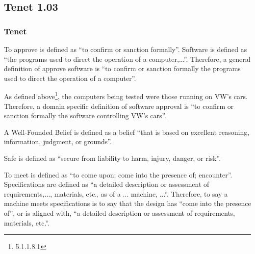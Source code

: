 \subsection{Tenet 1.03}
\subsubsection{Tenet}

To approve is defined as ``to confirm or sanction formally''\cite{dictionary_com}. Software is defined as ``the programs used to direct the operation of a computer,...''\cite{dictionary_com}. Therefore, a general definition of approve software is ``to confirm or sanction formally the programs used to direct the operation of a computer''.

As defined above\footnote{5.1.1.8.1}, the computers being tested were those running on VW's cars. Therefore, a domain specific definition of software approval is ``to confirm or sanction formally the software controlling VW's cars''.

A Well-Founded Belief is defined as a belief ``that is based on excellent reasoning, information, judgment, or grounds''\cite{merriam_webster}.

Safe is defined as ``secure from liability to harm, injury, danger, or risk''\cite{dictionary_com}.

To meet is defined as ``to come upon; come into the presence of; encounter''. Specifications are defined as ``a detailed description or assessment of requirements,..., materials, etc., as of a ... machine, ...''\cite{dictionary_com}. Therefore, to say a machine meets specifications is to say that the design has ``come into the presence of'', or is aligned with, ``a detailed description or assessment of requirements, materials, etc.''.

